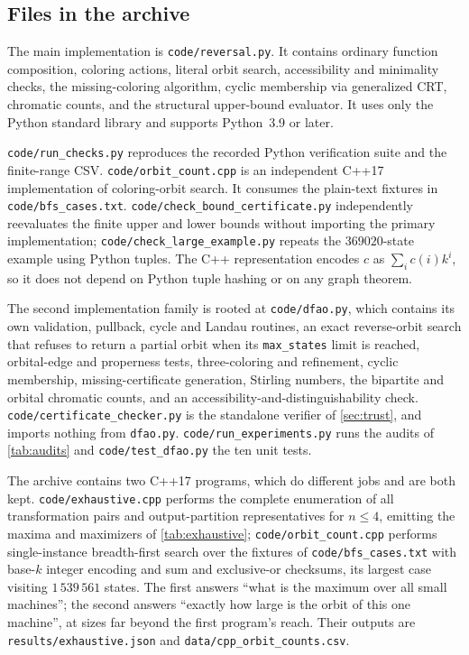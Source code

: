 \documentclass[11pt,a4paper]{article}
\numberwithin{equation}{section}
\theoremstyle{definition}
\theoremstyle{remark}
\begin{document}
\subsection{Files in the archive}

The main implementation is \texttt{code/reversal.py}. It contains ordinary
function composition, coloring actions, literal orbit search, accessibility
and minimality checks, the missing-coloring algorithm, cyclic membership via
generalized CRT, chromatic counts, and the structural upper-bound evaluator.
It uses only the Python standard library and supports Python~3.9 or later.

\texttt{code/run\_checks.py} reproduces the recorded Python verification
suite and the finite-range CSV. \texttt{code/orbit\_count.cpp} is an
independent C++17 implementation of coloring-orbit search. It consumes the
plain-text fixtures in \texttt{code/bfs\_cases.txt}.
\texttt{code/check\_bound\_certificate.py} independently reevaluates the
finite upper and lower bounds without importing the primary implementation;
\texttt{code/check\_large\_example.py} repeats the $369020$-state example
using Python tuples. The C++ representation
encodes $c$ as $\sum_i c(i)k^i$, so it does not depend on Python tuple hashing
or on any graph theorem.

The second implementation family is rooted at \texttt{code/dfao.py}, which
contains its own validation, pullback, cycle and Landau routines, an exact
reverse-orbit search that refuses to return a partial orbit when its
\texttt{max\_states} limit is reached, orbital-edge and properness tests,
three-coloring and refinement, cyclic membership, missing-certificate
generation, Stirling numbers, the bipartite and orbital chromatic counts, and
an accessibility-and-distinguishability check.
\texttt{code/certificate\_checker.py} is the standalone verifier of
\cref{sec:trust}, and imports nothing from \texttt{dfao.py}.
\texttt{code/run\_experiments.py} runs the audits of \cref{tab:audits} and
\texttt{code/test\_dfao.py} the ten unit tests.

\begin{remark}\label{rem:twocpp}
The archive contains two C++17 programs, which do different jobs and are both
kept. \texttt{code/exhaustive.cpp} performs the complete enumeration of all
transformation pairs and output-partition representatives for $n\le4$,
emitting the maxima and maximizers of \cref{tab:exhaustive};
\texttt{code/orbit\_count.cpp} performs single-instance breadth-first search
over the fixtures of \texttt{code/bfs\_cases.txt} with base-$k$ integer
encoding and sum and exclusive-or checksums, its largest case visiting
$1\,539\,561$ states. The first answers ``what is the maximum over all small
machines''; the second answers ``exactly how large is the orbit of this one
machine'', at sizes far beyond the first program's reach. Their outputs are
\texttt{results/exhaustive.json} and \texttt{data/cpp\_orbit\_counts.csv}.
\end{remark}
\end{document}
